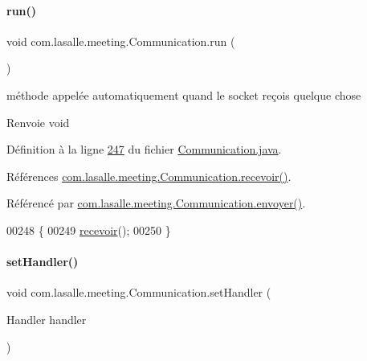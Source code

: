 \mbox{\label{classcom_1_1lasalle_1_1meeting_1_1_communication_afe29bde1b4538990bd0a8c9b2d512efa}} 
\paragraph{\texorpdfstring{run()}{run()}}
{\footnotesize\ttfamily void com.\+lasalle.\+meeting.\+Communication.\+run (\begin{DoxyParamCaption}{ }\end{DoxyParamCaption})}



méthode appelée automatiquement quand le socket reçois quelque chose 

\begin{DoxyReturn}{Renvoie}
void 
\end{DoxyReturn}


Définition à la ligne \hyperlink{_communication_8java_source_l00247}{247} du fichier \hyperlink{_communication_8java_source}{Communication.\+java}.



Références \hyperlink{_communication_8java_source_l00123}{com.\+lasalle.\+meeting.\+Communication.\+recevoir()}.



Référencé par \hyperlink{_communication_8java_source_l00161}{com.\+lasalle.\+meeting.\+Communication.\+envoyer()}.


\begin{DoxyCode}
00248     \{
00249         \hyperlink{classcom_1_1lasalle_1_1meeting_1_1_communication_a0344b79faa04dded3468fb8dda6baa81}{recevoir}();
00250     \}
\end{DoxyCode}
\mbox{\label{classcom_1_1lasalle_1_1meeting_1_1_communication_a872d98a1793108557acccd0e695892af}} 
\paragraph{\texorpdfstring{set\+Handler()}{setHandler()}}
{\footnotesize\ttfamily void com.\+lasalle.\+meeting.\+Communication.\+set\+Handler (\begin{DoxyParamCaption}\item[{Handler}]{handler }\end{DoxyParamCaption})}



